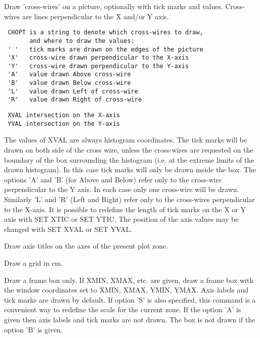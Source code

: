 \BEGARG
{}
\ENDARG
\BEGTEXT
Draw 'cross-wires' on a picture,
optionally with tick marks and values.
Cross-wires are lines perpendicular to the X and/or Y axis.
\begin{verbatim}
 CHOPT is a string to denote which cross-wires to draw,
       and where to draw the values:
 ' '   tick marks are drawn on the edges of the picture
 'X'   cross-wire drawn perpendicular to the X-axis
 'Y'   cross-wire drawn perpendicular to the Y-axis
 'A'   value drawn Above cross-wire
 'B'   value drawn Below cross-wire
 'L'   value drawn Left of cross-wire
 'R'   value drawn Right of cross-wire
\end{verbatim}

\begin{verbatim}
 XVAL intersection on the X-axis
 YVAL intersection on the Y-axis
\end{verbatim}
The values of XVAL are always histogram coordinates.
The tick marks will be drawn on both side of the cross
wire, unless the cross-wires are requested on the boundary
of the box surrounding the histogram (i.e. at the extreme
limits of the drawn histogram). In this case tick marks will
only be drawn inside the box.
The options 'A' and 'B' (for Above and Below)
refer only to the cross-wire perpendicular to the Y axis.
In each case only one cross-wire will be drawn.
Similarly 'L' and 'R' (Left and Right) refer only
to the cross-wires perpendicular to the X-axis.
It is possible to redefine the length of tick marks on the X or Y
axis with SET XTIC or SET YTIC.
The position of the axis values may be changed
with SET XVAL or SET YVAL.
\ENDTEXT

\BEGARG
{}
\ENDARG
\BEGTEXT
Draw axis titles on the axes of the present plot zone.
\ENDTEXT

\BEGTEXT
Draw a grid in cm.
\ENDTEXT

\BEGARG
{}
\ENDARG
\BEGTEXT
Draw a frame box only.
If XMIN, XMAX, etc. are given, draw a frame box with the window
coordinates set to XMIN, XMAX, YMIN, YMAX. Axis labels and tick marks
are drawn by default.
If option 'S' is also specified, this command is a convenient way
to redefine the scale for the current zone.
If the option 'A' is given then axis labels and tick marks are not drawn.
The box is not drawn if the option 'B' is given.
\ENDTEXT


